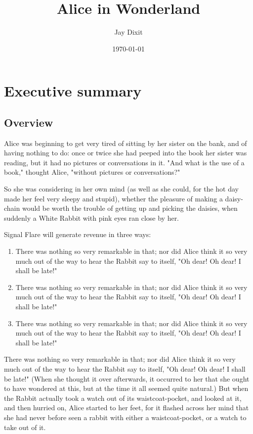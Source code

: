 \documentclass[12pt]{article}
\author{Jay Dixit}
\date{\today}
\title{Alice in Wonderland}
\def\maketitle{ \newgeometry{margin=1in} \thispagestyle{empty} \vfill \null \cleardoublepage\restoregeometry}
\begin{document}
\maketitle
\tableofcontents
\newpage


\section{Executive summary}
\label{sec:orgheadline6}
\subsection{Overview}
\label{sec:orgheadline1}
Alice was beginning to get very tired of sitting by her sister on the bank, and of having nothing to do: once or twice she had peeped into the book her sister was reading, but it had no pictures or conversations in it. "And what is the use of a book," thought Alice, "without pictures or conversations?" 

So she was considering in her own mind (as well as she could, for the hot day made her feel very sleepy and stupid), whether the pleasure of making a daisy-chain would be worth the trouble of getting up and picking the daisies, when suddenly a White Rabbit with pink eyes ran close by her. 

Signal Flare will generate revenue in three ways: 
\begin{enumerate}
\item There was nothing so very remarkable in that; nor did Alice think it so very much out of the way to hear the Rabbit say to itself, "Oh dear! Oh dear! I shall be late!"
\item There was nothing so very remarkable in that; nor did Alice think it so very much out of the way to hear the Rabbit say to itself, "Oh dear! Oh dear! I shall be late!"
\item There was nothing so very remarkable in that; nor did Alice think it so very much out of the way to hear the Rabbit say to itself, "Oh dear! Oh dear! I shall be late!"
\end{enumerate}

There was nothing so very remarkable in that; nor did Alice think it so very much out of the way to hear the Rabbit say to itself, "Oh dear! Oh dear! I shall be late!" (When she thought it over afterwards, it occurred to her that she ought to have wondered at this, but at the time it all seemed quite natural.) But when the Rabbit actually took a watch out of its waistcoat-pocket, and looked at it, and then hurried on, Alice started to her feet, for it flashed across her mind that she had never before seen a rabbit with either a waistcoat-pocket, or a watch to take out of it. 
\end{document}
